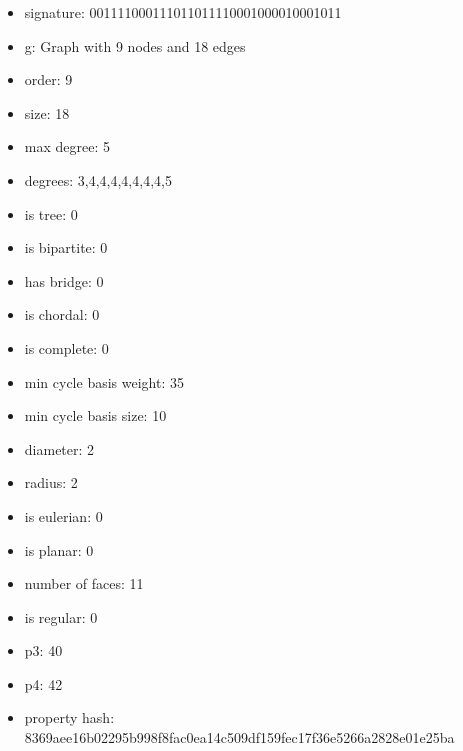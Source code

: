 \newpage
\begin{figure}
\end{figure}
\begin{itemize}
\item signature: 001111000111011011110001000010001011
\item g: Graph with 9 nodes and 18 edges
\item order: 9
\item size: 18
\item max degree: 5
\item degrees: 3,4,4,4,4,4,4,4,5
\item is tree: 0
\item is bipartite: 0
\item has bridge: 0
\item is chordal: 0
\item is complete: 0
\item min cycle basis weight: 35
\item min cycle basis size: 10
\item diameter: 2
\item radius: 2
\item is eulerian: 0
\item is planar: 0
\item number of faces: 11
\item is regular: 0
\item p3: 40
\item p4: 42
\item property hash: 8369aee16b02295b998f8fac0ea14c509df159fec17f36e5266a2828e01e25ba
\end{itemize}
